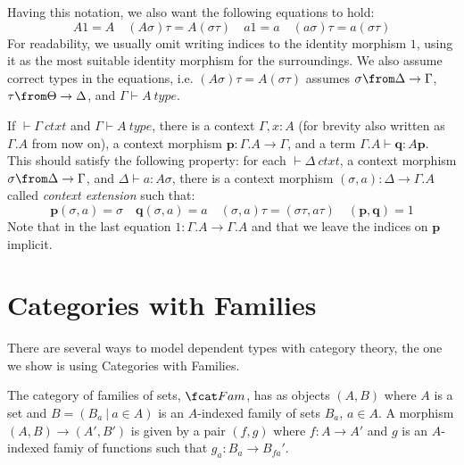 Having this notation, we also want the following equations to hold:
\[
  A1=A \quad (A\sigma)\tau = A(\sigma\tau) \quad a1=a \quad (a\sigma)\tau=a(\sigma\tau)
\]
For readability, we usually omit writing indices to the identity morphism $1$,
using it as the most suitable identity morphism for the surroundings. We also
assume correct types in the equations, i.e. $(A\sigma)\tau = A(\sigma\tau)$
assumes $\sigma \from \Delta \to \Gamma$, $\tau \from \Theta \to \Delta$, and
$\Gamma \vdash A~type$.

\begin{definition}
  If $\vdash \Gamma~ctxt$ and $\Gamma \vdash A~type$, there is a context
  $\Gamma, x:A$ (for brevity also written as $\Gamma.A$ from now on), a context
  morphism $\mathbf{p}: \Gamma.A \to \Gamma$, and a term $\Gamma.A \vdash
  \mathbf{q} : A \mathbf{p}$. This should satisfy the following property: for
  each $\vdash \Delta~ctxt$, a context morphism $\sigma \from \Delta \to
  \Gamma$, and $\Delta \vdash a : A \sigma$, there is a context morphism
  $(\sigma, a): \Delta \to \Gamma.A$ called \emph{context extension} such that:
  \[
    \mathbf{p}(\sigma, a) = \sigma \quad \mathbf{q}(\sigma, a) = a \quad (\sigma, a) \tau =
    (\sigma \tau, a \tau) \quad (\mathbf{p}, \mathbf{q}) = 1
  \]
  Note that in the last equation $1: \Gamma.A \to \Gamma.A$ and that we leave
  the indices on $\mathbf{p}$ implicit.
\end{definition}

\section*{Categories with Families}

There are several ways to model dependent types with category theory, the one
we show is using Categories with Families.

\begin{definition}
  The category of families of sets, $\Fam$, has as objects $(A, B)$ where
  $A$ is a set and $B = (B_a~|~a \in A)$ is an $A$-indexed family of sets $B_a$,
  $a \in A$. A morphism $(A, B) \to (A', B')$ is given by a pair $(f, g)$ where
  $f: A \to A'$ and $g$ is an $A$-indexed famiy of functions such that $g_a: B_a
  \to B_{fa}'$.
\end{definition}

